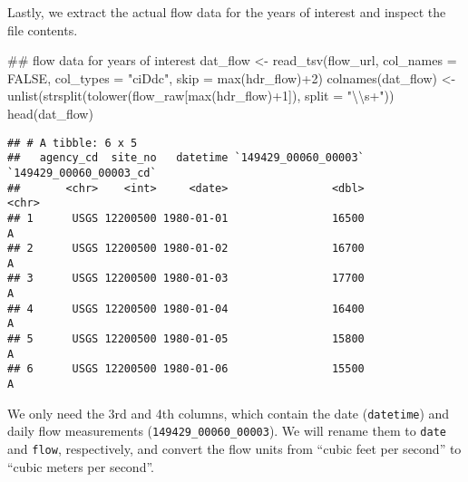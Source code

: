 \documentclass[11pt,]{article}
\newenvironment{Shaded}{}{}
\newcommand{\KeywordTok}[1]{\textcolor[rgb]{0.00,0.00,1.00}{#1}}
\newcommand{\DataTypeTok}[1]{#1}
\newcommand{\DecValTok}[1]{#1}
\newcommand{\CharTok}[1]{\textcolor[rgb]{0.00,0.50,0.50}{#1}}
\newcommand{\StringTok}[1]{\textcolor[rgb]{0.00,0.50,0.50}{#1}}
\newcommand{\OtherTok}[1]{\textcolor[rgb]{1.00,0.25,0.00}{#1}}
\newcommand{\OperatorTok}[1]{#1}
\newcommand{\NormalTok}[1]{#1}
\begin{document}
Lastly, we extract the actual flow data for the years of interest and
inspect the file contents.

\begin{Shaded}
\begin{Highlighting}[]
\NormalTok{## flow data for years of interest}
\NormalTok{dat_flow <-}\StringTok{  }\KeywordTok{read_tsv}\NormalTok{(flow_url,}
                      \DataTypeTok{col_names =} \OtherTok{FALSE}\NormalTok{,}
                      \DataTypeTok{col_types =} \StringTok{"ciDdc"}\NormalTok{,}
                      \DataTypeTok{skip =} \KeywordTok{max}\NormalTok{(hdr_flow)}\OperatorTok{+}\DecValTok{2}\NormalTok{)}
\KeywordTok{colnames}\NormalTok{(dat_flow) <-}\StringTok{ }\KeywordTok{unlist}\NormalTok{(}\KeywordTok{strsplit}\NormalTok{(}\KeywordTok{tolower}\NormalTok{(flow_raw[}\KeywordTok{max}\NormalTok{(hdr_flow)}\OperatorTok{+}\DecValTok{1}\NormalTok{]),}
                                      \DataTypeTok{split =} \StringTok{"}\CharTok{\textbackslash{}\textbackslash{}}\StringTok{s+"}\NormalTok{))}
\KeywordTok{head}\NormalTok{(dat_flow)}
\end{Highlighting}
\end{Shaded}

\begin{verbatim}
## # A tibble: 6 x 5
##   agency_cd  site_no   datetime `149429_00060_00003` `149429_00060_00003_cd`
##       <chr>    <int>     <date>                <dbl>                   <chr>
## 1      USGS 12200500 1980-01-01                16500                       A
## 2      USGS 12200500 1980-01-02                16700                       A
## 3      USGS 12200500 1980-01-03                17700                       A
## 4      USGS 12200500 1980-01-04                16400                       A
## 5      USGS 12200500 1980-01-05                15800                       A
## 6      USGS 12200500 1980-01-06                15500                       A
\end{verbatim}

We only need the 3rd and 4th columns, which contain the date
(\texttt{datetime}) and daily flow measurements
(\texttt{149429\_00060\_00003}). We will rename them to \texttt{date}
and \texttt{flow}, respectively, and convert the flow units from ``cubic
feet per second'' to ``cubic meters per second''.
\end{document}
